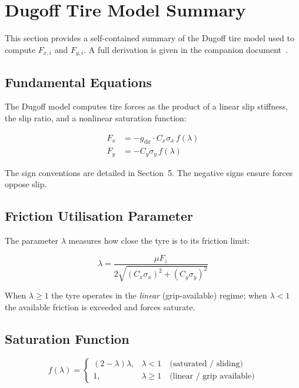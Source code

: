\documentclass[11pt,a4paper]{article}
\begin{document}
\section{Dugoff Tire Model Summary}

This section provides a self-contained summary of the Dugoff tire model used to compute $F_{x,i}$ and $F_{y,i}$. A full derivation is given in the companion document~\cite{dugoff_doc}.

\subsection{Fundamental Equations}

The Dugoff model computes tire forces as the product of a linear slip stiffness, the slip ratio, and a nonlinear saturation function:

\begin{align}
F_x &= -g_{\text{dir}} \cdot C_x \sigma_x \, f(\lambda) \\
F_y &= -C_y \sigma_y \, f(\lambda)
\end{align}

The sign conventions are detailed in Section~5. The negative signs ensure forces oppose slip.

\subsection{Friction Utilisation Parameter}

The parameter $\lambda$ measures how close the tyre is to its friction limit:

\begin{equation}
\lambda = \frac{\mu F_z}{2\sqrt{(C_x \sigma_x)^2 + (C_y \sigma_y)^2}}
\end{equation}

When $\lambda \geq 1$ the tyre operates in the \emph{linear} (grip-available) regime; when $\lambda < 1$ the available friction is exceeded and forces saturate.

\subsection{Saturation Function}

\begin{equation}
f(\lambda) = \begin{cases}
(2 - \lambda)\lambda, & \lambda < 1 \quad \text{(saturated / sliding)} \\
1,                     & \lambda \geq 1 \quad \text{(linear / grip available)}
\end{cases}
\end{equation}
\end{document}
